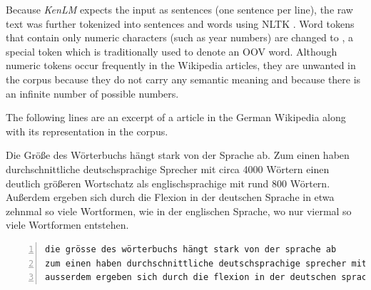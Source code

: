 Because \textit{KenLM} expects the input as sentences (one sentence per line), the raw text was further tokenized into sentences and words using NLTK \parencite{nltk}. Word tokens that contain only numeric characters (such as year numbers) are changed to , a special token which is traditionally used to denote an \ac{OOV} word. Although numeric tokens occur frequently in the Wikipedia articles, they are unwanted in the corpus because they do not carry any semantic meaning and because there is an infinite number of possible numbers.

The following lines are an excerpt of a article in the German Wikipedia along with its representation in the corpus.

\begin{displayquote}
Die Größe des Wörterbuchs hängt stark von der Sprache ab. Zum einen haben durchschnittliche deutschsprachige Sprecher mit circa 4000 Wörtern einen deutlich größeren Wortschatz als englischsprachige mit rund 800 Wörtern. Außerdem ergeben sich durch die Flexion in der deutschen Sprache in etwa zehnmal so viele Wortformen, wie in der englischen Sprache, wo nur viermal so viele Wortformen entstehen.
\end{displayquote}

\begin{lstlisting}[numbers=left, caption=Representation in corpus]
die grösse des wörterbuchs hängt stark von der sprache ab
zum einen haben durchschnittliche deutschsprachige sprecher mit circa <unk> wörtern einen deutlich grösseren wortschatz als englischsprachige mit rund <unk> wörtern
ausserdem ergeben sich durch die flexion in der deutschen sprache in etwa zehnmal so viele wortformen wie in der englischen sprache wo nur viermal so viele wortformen entstehen
\end{lstlisting}

